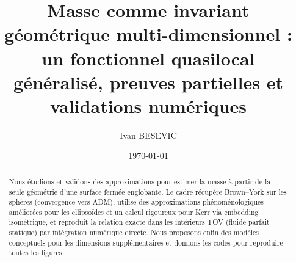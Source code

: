\documentclass[11pt]{article}
\title{Masse comme invariant g\'eom\'etrique multi-dimensionnel : \\ 
un fonctionnel quasilocal g\'en\'eralis\'e, preuves partielles et validations num\'eriques}
\author{Ivan BESEVIC}
\date{\today}
\begin{document}
\maketitle

\begin{abstract}
Nous \'etudions et validons des approximations pour estimer la masse \`a partir de la seule g\'eom\'etrie d'une surface ferm\'ee englobante. 
Le cadre r\'ecup\`ere Brown--York sur les sph\`eres (convergence vers ADM), utilise des approximations ph\'enom\'enologiques am\'elior\'ees pour les ellipso\"ides et un calcul rigoureux pour Kerr via embedding isom\'etrique, et reproduit la relation exacte dans les int\'erieurs TOV (fluide parfait statique) par int\'egration num\'erique directe. 
Nous proposons enfin des mod\`eles conceptuels pour les dimensions suppl\'ementaires et donnons les codes pour reproduire toutes les figures.
\end{abstract}
\end{document}
